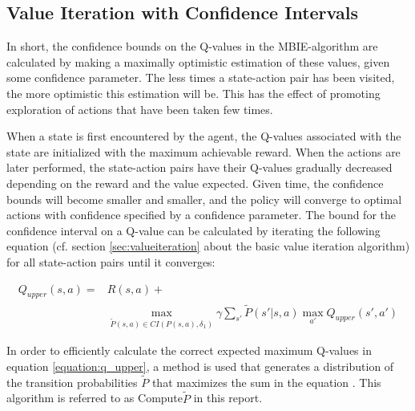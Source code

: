 
\subsection{Value Iteration with Confidence Intervals }
\label{sec:modification_conf_interval}


In short, the confidence  bounds on the Q-values in the MBIE-algorithm are calculated by making a maximally optimistic estimation of these values, given some confidence parameter. The less times a state-action pair has been visited, the more optimistic this estimation will be. This has the effect of promoting exploration of actions that have been taken few times. 

When a state is first encountered by the agent, the Q-values associated with the state are initialized with the maximum achievable reward. When the actions are later performed, the state-action pairs have their Q-values gradually decreased depending on the reward and the value expected. 
Given time, the confidence bounds will become smaller and smaller, and the policy will converge to optimal actions with confidence specified by a confidence parameter. The bound for the confidence interval on a Q-value can be calculated by iterating the following equation (cf. section \ref{sec:valueiteration} about the basic value iteration algorithm) for all state-action pairs until it converges:

\begin{align}
\label{equation:q_upper}
Q_{upper} (s, a) = & R(s, a) + \nonumber \\
& \operatorname*{max}_{\tilde{P}(s, a)\in CI(P(s, a), \delta_1)} \gamma \sum_{s'} \tilde{P}(s'|s, a)\operatorname*{max}_{a'} Q_{upper}(s', a')
\end{align}



In order to efficiently calculate the correct expected maximum Q-values in equation \ref{equation:q_upper}, a method is used that generates a distribution of the transition probabilities $\tilde{P}$ that maximizes the sum in the equation \parencite{Strehl20081309}. This algorithm is referred to as Compute$\tilde{P}$ in this report.


